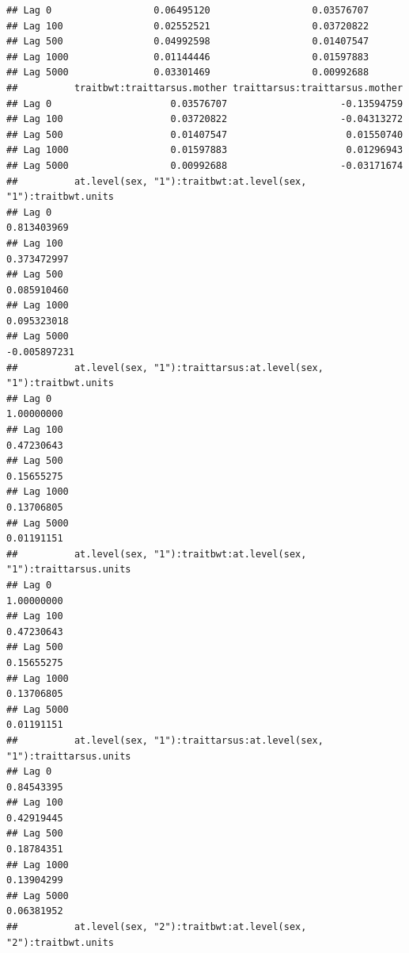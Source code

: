 \documentclass[
  12pt,
]{book}
\begin{document}
\begin{verbatim}
## Lag 0                  0.06495120                  0.03576707
## Lag 100                0.02552521                  0.03720822
## Lag 500                0.04992598                  0.01407547
## Lag 1000               0.01144446                  0.01597883
## Lag 5000               0.03301469                  0.00992688
##          traitbwt:traittarsus.mother traittarsus:traittarsus.mother
## Lag 0                     0.03576707                    -0.13594759
## Lag 100                   0.03720822                    -0.04313272
## Lag 500                   0.01407547                     0.01550740
## Lag 1000                  0.01597883                     0.01296943
## Lag 5000                  0.00992688                    -0.03171674
##          at.level(sex, "1"):traitbwt:at.level(sex, "1"):traitbwt.units
## Lag 0                                                      0.813403969
## Lag 100                                                    0.373472997
## Lag 500                                                    0.085910460
## Lag 1000                                                   0.095323018
## Lag 5000                                                  -0.005897231
##          at.level(sex, "1"):traittarsus:at.level(sex, "1"):traitbwt.units
## Lag 0                                                          1.00000000
## Lag 100                                                        0.47230643
## Lag 500                                                        0.15655275
## Lag 1000                                                       0.13706805
## Lag 5000                                                       0.01191151
##          at.level(sex, "1"):traitbwt:at.level(sex, "1"):traittarsus.units
## Lag 0                                                          1.00000000
## Lag 100                                                        0.47230643
## Lag 500                                                        0.15655275
## Lag 1000                                                       0.13706805
## Lag 5000                                                       0.01191151
##          at.level(sex, "1"):traittarsus:at.level(sex, "1"):traittarsus.units
## Lag 0                                                             0.84543395
## Lag 100                                                           0.42919445
## Lag 500                                                           0.18784351
## Lag 1000                                                          0.13904299
## Lag 5000                                                          0.06381952
##          at.level(sex, "2"):traitbwt:at.level(sex, "2"):traitbwt.units

\end{verbatim}
\end{document}

